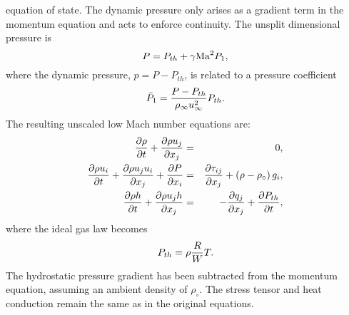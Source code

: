 equation of state.  The dynamic pressure only arises as a gradient
term in the momentum equation and acts to enforce continuity. 
The unsplit dimensional pressure is
%
\begin{equation}
  P = P_{th} + \gamma {\rm Ma}^2 P_1,
\end{equation}
%
where the dynamic pressure, $p=P-P_{th}$, is related to a pressure coefficient
%
\begin{equation}
  \bar{P}_1 = {{P - P_{th}} \over {\rho_\infty u^2_\infty}} P_{th}.
\end{equation}
%
The resulting unscaled low Mach number equations are:
%
\begin{eqnarray}
{{\partial \rho} \over {\partial t}} + {{\partial \rho u_j} 
                               \over {\partial x_j}} & =  & 0, \label{lmcon} \\
{{\partial \rho u_i} \over {\partial t}} + {{\partial \rho u_j u_i}
    \over {\partial x_j}} + {{\partial P} \over {\partial x_i}} & = &
    {{\partial \tau_{ij}} \over {\partial x_j}} 
     +  \left( \rho - \rho_{\circ} \right) g_i, \label{lmmom} \\
{{\partial \rho h} \over {\partial t}} + {{\partial \rho u_j h}
    \over {\partial x_j}}  & = &
    - {{\partial q_j} \over {\partial x_j}}
    + {{\partial P_{th}} \over {\partial t}}, \label{lmenrg}
\end{eqnarray}
%
where the ideal gas law becomes
%
\begin{equation}
P_{th}  =  \rho {R \over W} T.
\end{equation}
%
The hydrostatic pressure gradient has been subtracted
from the momentum equation, assuming an ambient density
of $\rho_{\circ}$.  The stress tensor and heat conduction 
remain the same as in the original equations.
